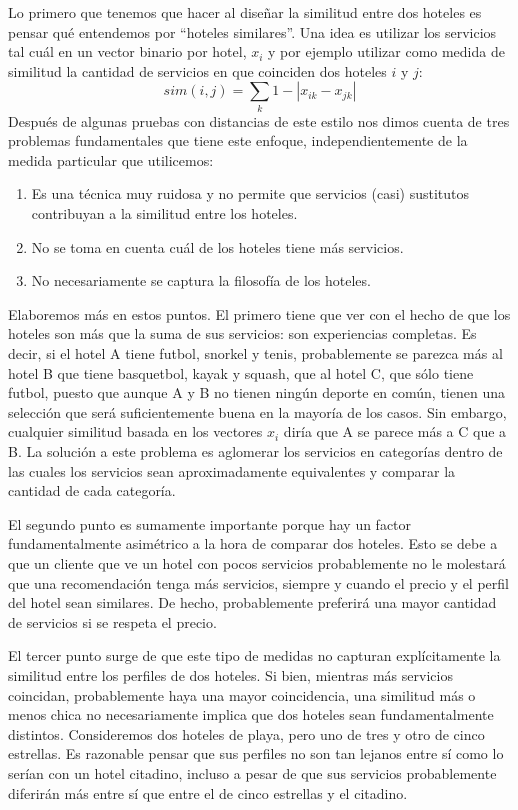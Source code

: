 \documentclass[12pt]{report}
\begin{document}
Lo primero que tenemos que hacer al diseñar la similitud entre dos hoteles es pensar qué entendemos por ``hoteles similares''. Una idea es utilizar los servicios tal cuál en un vector binario por hotel, $x_i$ y por ejemplo utilizar como medida de similitud la cantidad de servicios en que coinciden dos hoteles $i$ y $j$:
\[
sim(i,j) = \sum_k 1 - |x_{ik} - x_{jk}|
\]
Después de algunas pruebas con distancias de este estilo nos dimos cuenta de tres problemas fundamentales que tiene este enfoque, independientemente de la medida particular que utilicemos:
\begin{enumerate}
	\item Es una técnica muy ruidosa y no permite que servicios (casi) sustitutos contribuyan a la similitud entre los hoteles.
	\item No se toma en cuenta cuál de los hoteles tiene más servicios.
	\item No necesariamente se captura la filosofía de los hoteles.
\end{enumerate}
Elaboremos más en estos puntos. El primero tiene que ver con el hecho de que los hoteles son más que la suma de sus servicios: son experiencias completas. Es decir, si el hotel A tiene futbol, snorkel y tenis, probablemente se parezca más al hotel B que tiene basquetbol, kayak y squash, que al hotel C, que sólo tiene futbol, puesto que aunque A y B no tienen ningún deporte en común, tienen una selección que será suficientemente buena en la mayoría de los casos. Sin embargo, cualquier similitud basada en los vectores $x_i$ diría que A se parece más a C que a B. La solución a este problema es aglomerar los servicios en categorías dentro de las cuales los servicios sean aproximadamente equivalentes y comparar la cantidad de cada categoría.

El segundo punto es sumamente importante porque hay un factor fundamentalmente asimétrico a la hora de comparar dos hoteles. Esto se debe a que un cliente que ve un hotel con pocos servicios probablemente no le molestará que una recomendación tenga más servicios, siempre y cuando el precio y el perfil del hotel sean similares. De hecho, probablemente preferirá una mayor cantidad de servicios si se respeta el precio.

El tercer punto surge de que este tipo de medidas no capturan explícitamente la similitud entre los perfiles de dos hoteles. Si bien, mientras más servicios coincidan, probablemente haya una mayor coincidencia, una similitud más o menos chica no necesariamente implica que dos hoteles sean fundamentalmente distintos. Consideremos dos hoteles de playa, pero uno de tres y otro de cinco estrellas. Es razonable pensar que sus perfiles no son tan lejanos entre sí como lo serían con un hotel citadino, incluso a pesar de que sus servicios probablemente diferirán más entre sí que entre el de cinco estrellas y el citadino.
\end{document}
